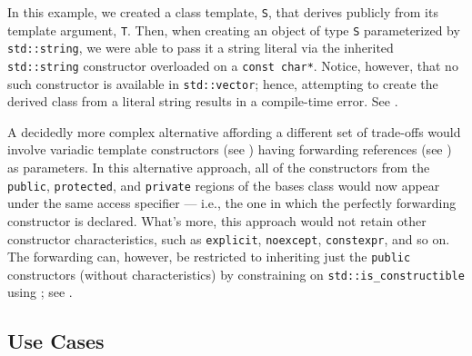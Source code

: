 \noindent In this example, we created a class template, \lstinline!S!, that
derives publicly from its template argument, \lstinline!T!. Then, when
creating an object of type \lstinline!S! parameterized by
\lstinline!std::string!, we were able to pass it a string literal via
the inherited \lstinline!std::string! constructor overloaded on a
\lstinline!const!~\lstinline!char*!. Notice, however, that no such constructor
is available in \lstinline!std::vector!; hence, attempting to create the
derived class from a literal string results in a compile-time error. See . 

A decidedly more
complex alternative affording a different set of trade-offs would
  involve variadic template constructors (see ) 
  having
 forwarding references (see ) 
 as parameters. In this
  alternative approach, all of the constructors from the
  \mbox{\lstinline!public!}, \mbox{\lstinline!protected!}, and \mbox{\lstinline!private!} regions of the
  bases class would now appear under the same access specifier --- i.e.,
  the one in which the perfectly forwarding constructor is declared.
  What's more, this approach would not retain other constructor
  characteristics, such as \lstinline!explicit!, \lstinline!noexcept!,
  \lstinline!constexpr!, and so on. The forwarding can, however, be restricted to
  inheriting just the \lstinline!public! constructors (without
  characteristics) by constraining on \lstinline!std::is_constructible!
  using ; see .

\subsection[Use Cases]{Use Cases}\label{use-cases-ctorinheriting}
\label{abstract-use-case}

